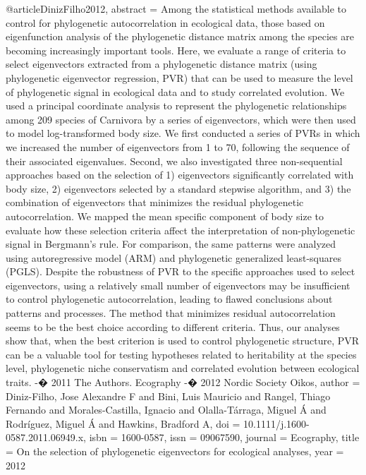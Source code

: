 {{{{{{{@article{DinizFilho2012,
abstract = {Among the statistical methods available to control for phylogenetic autocorrelation in ecological data, those based on eigenfunction analysis of the phylogenetic distance matrix among the species are becoming increasingly important tools. Here, we evaluate a range of criteria to select eigenvectors extracted from a phylogenetic distance matrix (using phylogenetic eigenvector regression, PVR) that can be used to measure the level of phylogenetic signal in ecological data and to study correlated evolution. We used a principal coordinate analysis to represent the phylogenetic relationships among 209 species of Carnivora by a series of eigenvectors, which were then used to model log-transformed body size. We first conducted a series of PVRs in which we increased the number of eigenvectors from 1 to 70, following the sequence of their associated eigenvalues. Second, we also investigated three non-sequential approaches based on the selection of 1) eigenvectors significantly correlated with body size, 2) eigenvectors selected by a standard stepwise algorithm, and 3) the combination of eigenvectors that minimizes the residual phylogenetic autocorrelation. We mapped the mean specific component of body size to evaluate how these selection criteria affect the interpretation of non-phylogenetic signal in Bergmann's rule. For comparison, the same patterns were analyzed using autoregressive model (ARM) and phylogenetic generalized least-squares (PGLS). Despite the robustness of PVR to the specific approaches used to select eigenvectors, using a relatively small number of eigenvectors may be insufficient to control phylogenetic autocorrelation, leading to flawed conclusions about patterns and processes. The method that minimizes residual autocorrelation seems to be the best choice according to different criteria. Thus, our analyses show that, when the best criterion is used to control phylogenetic structure, PVR can be a valuable tool for testing hypotheses related to heritability at the species level, phylogenetic niche conservatism and correlated evolution between ecological traits. -� 2011 The Authors. Ecography -� 2012 Nordic Society Oikos},
author = {Diniz-Filho, Jose Alexandre F and Bini, Luis Mauricio and Rangel, Thiago Fernando and Morales-Castilla, Ignacio and Olalla-T{\'{a}}rraga, Miguel {\'{A}} and Rodr{\'{i}}guez, Miguel {\'{A}} and Hawkins, Bradford A},
doi = {10.1111/j.1600-0587.2011.06949.x},
isbn = {1600-0587},
issn = {09067590},
journal = {Ecography},
title = {{On the selection of phylogenetic eigenvectors for ecological analyses}},
year = {2012}
}


}}}}}}}
